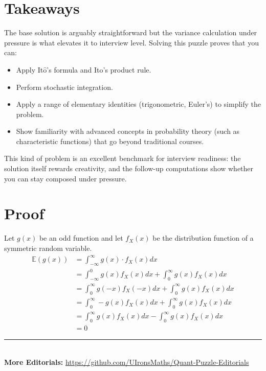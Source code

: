\documentclass[12pt]{article}
\newcommand{\Itos}{It$\hat{\text{o}}$'s }
\begin{document}
\bigskip

\section*{Takeaways}
The base solution is arguably straightforward but the variance calculation under pressure is what elevates it to interview level. Solving this puzzle proves that you can:

\begin{itemize}
    \item Apply \Itos formula and \Itos product rule.
    \item Perform stochastic integration.
    \item Apply a range of elementary identities (trigonometric, Euler's) to simplify the problem.
    \item Show familiarity with advanced concepts in probability theory (such as characteristic functions) that go beyond traditional courses.
\end{itemize}

This kind of problem is an excellent benchmark for interview readiness: the solution itself rewards creativity, and the follow-up computations show whether you can stay composed under pressure.

\bigskip

\section*{Proof}
Let $g(x)$ be an odd function and let $f_X(x)$ be the distribution function of a symmetric random variable.
\begin{align*}
\mathbb{E}(g(x)) &= \int_{-\infty}^{\infty}g(x)\cdot f_X(x) dx\\
&= \int_{-\infty}^{0}g(x)f_X(x)dx + \int_0^{\infty}g(x)f_X(x)dx\\
&=\int_{0}^{\infty}g(-x)f_X(-x)dx + \int_0^{\infty}g(x)f_X(x)dx\\
&=\int_{0}^{\infty}-g(x)f_X(x)dx + \int_0^{\infty}g(x)f_X(x)dx\\
&=\int_0^{\infty}g(x)f_X(x)dx - \int_0^{\infty}g(x)f_X(x)dx\\
&= 0
\end{align*}

\vspace*{\fill}
\begin{center}
    \rule{\linewidth}{0.5pt} \\
    \textbf{More Editorials:} \href{https://github.com/UIronsMaths/Quant-Puzzle-Editorials}{https://github.com/UIronsMaths/Quant-Puzzle-Editorials}
\end{center}
\end{document}
